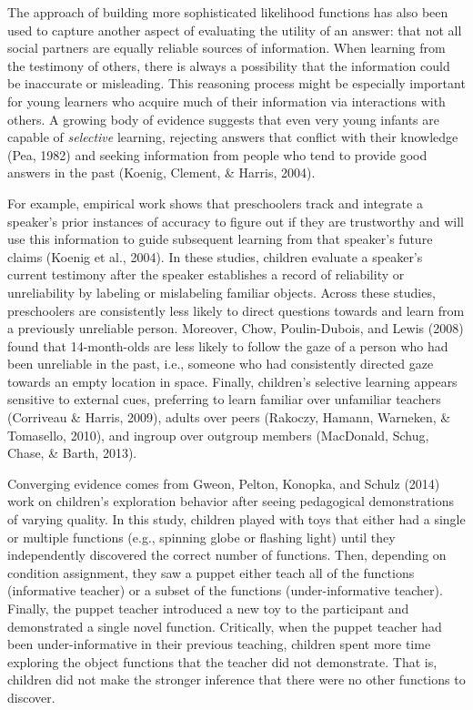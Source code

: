 \documentclass[english,floatsintext,man]{apa6}
\theoremstyle{definition}
\theoremstyle{definition}
\theoremstyle{definition}
\theoremstyle{remark}
\begin{document}
The approach of building more sophisticated likelihood functions has
also been used to capture another aspect of evaluating the utility of an
answer: that not all social partners are equally reliable sources of
information. When learning from the testimony of others, there is always
a possibility that the information could be inaccurate or misleading.
This reasoning process might be especially important for young learners
who acquire much of their information via interactions with others. A
growing body of evidence suggests that even very young infants are
capable of \emph{selective} learning, rejecting answers that conflict
with their knowledge (Pea, 1982) and seeking information from people who
tend to provide good answers in the past (Koenig, Clement, \& Harris,
2004).

For example, empirical work shows that preschoolers track and integrate
a speaker's prior instances of accuracy to figure out if they are
trustworthy and will use this information to guide subsequent learning
from that speaker's future claims (Koenig et al., 2004). In these
studies, children evaluate a speaker's current testimony after the
speaker establishes a record of reliability or unreliability by labeling
or mislabeling familiar objects. Across these studies, preschoolers are
consistently less likely to direct questions towards and learn from a
previously unreliable person. Moreover, Chow, Poulin-Dubois, and Lewis
(2008) found that 14-month-olds are less likely to follow the gaze of a
person who had been unreliable in the past, i.e., someone who had
consistently directed gaze towards an empty location in space. Finally,
children's selective learning appears sensitive to external cues,
preferring to learn familiar over unfamiliar teachers (Corriveau \&
Harris, 2009), adults over peers (Rakoczy, Hamann, Warneken, \&
Tomasello, 2010), and ingroup over outgroup members (MacDonald, Schug,
Chase, \& Barth, 2013).

Converging evidence comes from Gweon, Pelton, Konopka, and Schulz (2014)
work on children's exploration behavior after seeing pedagogical
demonstrations of varying quality. In this study, children played with
toys that either had a single or multiple functions (e.g., spinning
globe or flashing light) until they independently discovered the correct
number of functions. Then, depending on condition assignment, they saw a
puppet either teach all of the functions (informative teacher) or a
subset of the functions (under-informative teacher). Finally, the puppet
teacher introduced a new toy to the participant and demonstrated a
single novel function. Critically, when the puppet teacher had been
under-informative in their previous teaching, children spent more time
exploring the object functions that the teacher did not demonstrate.
That is, children did not make the stronger inference that there were no
other functions to discover.
\end{document}
